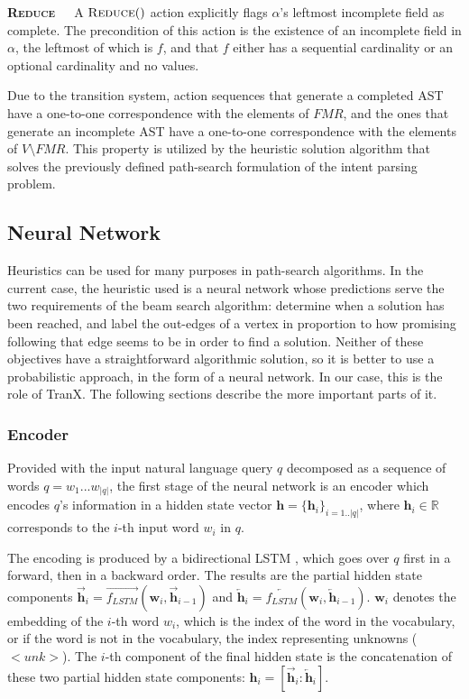 \textbf{\textsc{Reduce}}\ \ \ A \(\textsc{Reduce}()\) action explicitly
flags \(\alpha\)'s leftmost incomplete field as complete. The precondition
of this action is the existence of an incomplete field in \(\alpha\),
the leftmost of which is \(f\), and that \(f\) either has a sequential
cardinality or an optional cardinality and no values.

Due to the transition system, action sequences that generate a completed
AST have a one-to-one correspondence with the elements of \(FMR\),
and the ones that generate an incomplete AST have a one-to-one correspondence
with the elements of \(V \setminus FMR\). This property is utilized by the
heuristic solution algorithm that solves the previously defined path-search
formulation of the intent parsing problem.

\subsection{Neural Network}

Heuristics can be used for many purposes in path-search algorithms. In the current
case, the heuristic used is a neural network whose predictions serve the two
requirements of the beam search algorithm: determine when a solution has been
reached, and label the out-edges of a vertex in proportion to how promising
following that edge seems to be in order to find a solution. Neither of these
objectives have a straightforward algorithmic solution, so it is better
to use a probabilistic approach, in the form of a neural network. In our case, 
this is the role of TranX. The following sections describe the more important
parts of it.

\subsubsection{Encoder}

Provided with the input natural language query \(q\) decomposed as a sequence
of words \(q = w_{1}...w_{|q|}\), the first stage of the neural network is an
encoder which encodes \(q\)'s information in a hidden state vector \(\mathbf{h} =
\{\mathbf{h}_{i}\}_{i=1..|q|}\), where \(\mathbf{h}_{i} \in \mathbb{R}\)
corresponds to the \(i\)-th input word \(w_{i}\) in \(q\).

The encoding is produced by a bidirectional LSTM \cite{HochreiterSchmidhuber1997,
SchusterPaliwal1997}, which goes over \(q\) first in a forward, then in a backward
order. The results are the partial hidden state components
\(\overrightarrow{\mathbf{h}}_{i} = \overrightarrow{f_{LSTM}}(\mathbf{w}_{i}, \overrightarrow{\mathbf{h}}_{i-1})\) and \(\overleftarrow{\mathbf{h}}_{i} =
\overleftarrow{f_{LSTM}}(\mathbf{w}_{i}, \overleftarrow{\mathbf{h}}_{i-1})\).
\(\mathbf{w}_{i}\) denotes the embedding of the \(i\)-th word \(w_{i}\), 
which is the index of the word in the vocabulary, or if the word is not
in the vocabulary, the index representing unknowns (\(<unk>\)).
The \(i\)-th component of the final hidden state is the concatenation of
these two partial hidden state components: \(\mathbf{h}_{i} = 
[\overrightarrow{\mathbf{h}}_{i} : \overleftarrow{\mathbf{h}}_{i}]\).

